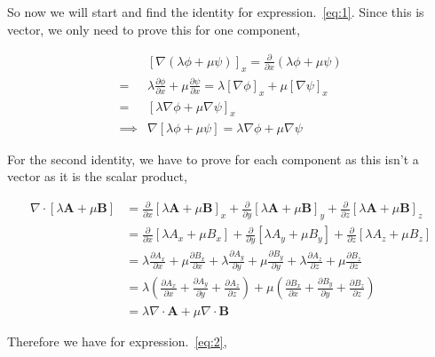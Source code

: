 \documentclass[11pt]{amsart}
\begin{document}
So now we will start and find the identity for expression.~\ref{eq:1}. Since this is vector, we only need to prove this for one component,

\begin{align*}
  &{\left[\nabla(\lambda \phi + \mu \psi)\right]}_x = \frac{\partial}{\partial x}\left(\lambda\phi + \mu\psi\right) \\
  =& \lambda \frac{\partial \phi}{\partial x} + \mu \frac{\partial \psi}{\partial x} = \lambda{[\nabla\phi]}_x + \mu{[\nabla \psi]}_x \\
  =& {\left[\lambda \nabla \phi + \mu \nabla \psi\right]}_x \\
  \implies& \nabla[\lambda \phi + \mu \psi] = \lambda\nabla\phi + \mu\nabla\psi
\end{align*}

For the second identity, we have to prove for each component as this isn't a vector as it is the scalar product,

\begin{align*}
  \nabla\cdot[\lambda\mathbf{A} + \mu\mathbf{B}] &= \frac{\partial}{\partial x} {\left[\lambda \mathbf{A} + \mu \mathbf{B}\right]}_x + \frac{\partial}{\partial y} {\left[\lambda \mathbf{A} + \mu \mathbf{B}\right]}_y + \frac{\partial}{\partial z} {\left[\lambda \mathbf{A} + \mu \mathbf{B}\right]}_z \\
                                                 &= \frac{\partial}{\partial x} \left[\lambda A_x + \mu B_x \right] +\frac{\partial}{\partial y} \left[\lambda A_y + \mu B_y \right] +\frac{\partial}{\partial z} \left[\lambda A_z + \mu B_z \right] \\
                                                 &= \lambda \frac{\partial A_x}{\partial x} + \mu \frac{\partial B_x}{\partial x} + \lambda \frac{\partial A_y}{\partial y} + \mu \frac{\partial B_y}{\partial y} + \lambda \frac{\partial A_z}{\partial z} + \mu \frac{\partial B_z}{\partial z} \\
                                                 &= \lambda \left(\frac{\partial A_x}{\partial x} + \frac{\partial A_y}{\partial y} + \frac{\partial A_z}{\partial z}\right) + \mu \left(\frac{\partial B_x}{\partial x} + \frac{\partial B_y}{\partial y} + \frac{\partial B_z}{\partial z}\right) \\
                                                 &= \lambda \nabla \cdot \mathbf{A} + \mu \nabla \cdot \mathbf{B}
\end{align*}

Therefore we have for expression.~\ref{eq:2},
\end{document}
